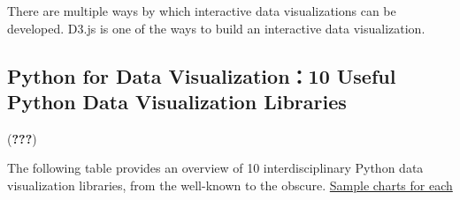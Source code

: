 \documentclass[]{book}
\begin{document}
There are multiple ways by which interactive data visualizations can be developed. D3.js is one of the ways to build an interactive data visualization.

\hypertarget{python-for-data-visualization10-useful-python-data-visualization-libraries}{%
\subsection{Python for Data Visualization：10 Useful Python Data Visualization Libraries}\label{python-for-data-visualization10-useful-python-data-visualization-libraries}}

({\textbf{???}})

The following table provides an overview of 10 interdisciplinary Python data visualization libraries, from the well-known to the obscure.
\href{https://blog.modeanalytics.com/python-data-visualization-libraries/}{Sample charts for each}
\end{document}
